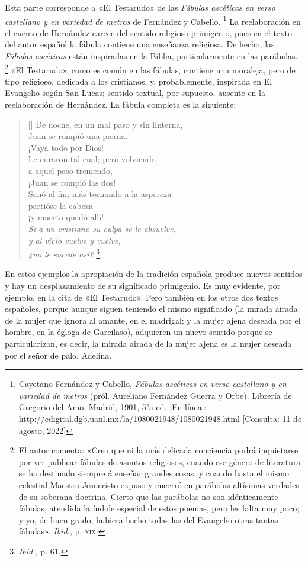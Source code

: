 \documentclass[14pt,twoside,final]{extbook} %
\let\oldfootnote\footnote
\renewcommand\footnote[1]{%
\oldfootnote{\hspace{1mm}#1}}
\begin{document}
Esta parte corresponde a «El Testarudo» de las \emph{Fábulas ascéticas en verso castellano y en variedad de metros} de Fernández y Cabello.\footnote{Cayetano Fernández y Cabello, \emph{Fábulas ascéticas en verso castellano y en variedad de metros} (pról. Aureliano Fernández Guerra y Orbe). Librería de Gregorio del Amo, Madrid, 1901, 5"a ed. [En línea]: \url{http://cdigital.dgb.uanl.mx/la/1080021948/1080021948.html} [Consulta: 11 de agosto, 2022]} La reelaboración en el cuento de Hernández carece del sentido religioso primigenio, pues en el texto del autor español la fábula contiene una enseñanza religiosa. De hecho, las \emph{Fábulas ascéticas} están inspiradas en la Biblia, particularmente en las parábolas.\footnote{El autor comenta: «Creo que ni la más delicada conciencia podrá inquietarse por ver publicar fábulas de asuntos religiosos, cuando ese género de literatura se ha destinado siempre á enseñar grandes cosas, y cuando hasta el mismo celestial Maestro Jesucristo expuso y encerró en parábolas altísimas verdades de su soberana doctrina. Cierto que las parábolas no son idénticamente fábulas, atendida la índole especial de estos poemas, pero les falta muy poco; y yo, de buen grado, hubiera hecho todas las del Evangelio otras tantas fábulas». \emph{Ibid.,} p. \textsc{xix}.} «El Testarudo», como es común en las fábulas, contiene una moraleja, pero de tipo religioso, dedicada a los cristianos, y, probablemente, inspirada en El Evangelio según San Lucas; sentido textual, por supuesto, ausente en la reelaboración de Hernández. La fábula completa es la siguiente:
\settowidth{\versewidth}{Si a un cristiano su culpa se le absuelve,}
\begin{verse}[\versewidth]
De noche, en un mal paso y sin linterna, \\
Juan se rompió una pierna. \\
¡Vaya todo por Dios! \\
Le curaron tal cual; pero volviendo \\
a aquel paso tremendo, \\
¡Juan se rompió las dos! \\
Sanó al fin; más tornando a la aspereza \\
partióse la cabeza \\
¡y muerto quedó allí! \\
\emph{Si a un cristiano su culpa se le absuelve, \\
y al vicio vuelve y vuelve, \\
¿no le sucede así?}\footnote{\emph{Ibid.,} p. 61.}
\end{verse}
En estos ejemplos la apropiación de la tradición española produce nuevos sentidos y hay un desplazamiento de su significado primigenio. Es muy evidente, por ejemplo, en la cita de «El Testarudo». Pero también en los otros dos textos españoles, porque aunque siguen teniendo el mismo significado (la mirada airada de la mujer que ignora al amante, en el madrigal; y la mujer ajena deseada por el hombre, en la égloga de Garcilaso), adquieren un nuevo sentido porque se particularizan, es decir, la mirada airada de la mujer ajena es la mujer deseada por el señor de palo, Adelina.
\end{document}
